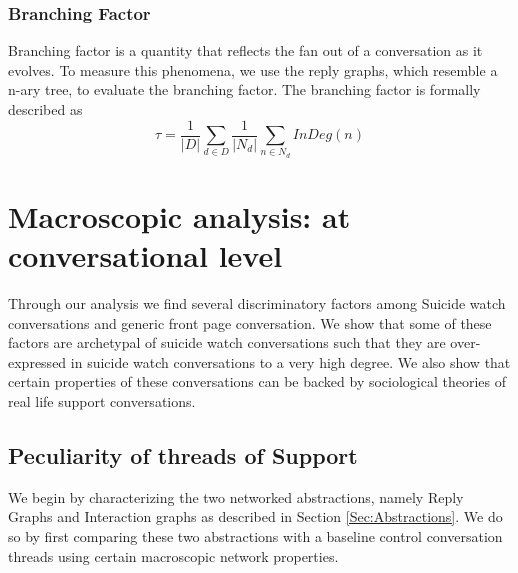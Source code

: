 \subsubsection{Branching Factor}
\label{Sec:Branching}
Branching factor is a quantity that reflects the fan out of a conversation as it evolves.
To measure this phenomena, we use the reply graphs, which resemble a n-ary tree, to evaluate the branching factor. The branching factor is formally described as 
$$\tau = \frac{1}{|D|} \sum_{d \in D}^{} \frac{1}{|N_d|} \sum_{n\in N_d}^{} \textit{InDeg}(n)$$




\section{Macroscopic analysis: at conversational level}

Through our analysis we find several discriminatory factors among Suicide watch conversations and generic front page conversation. We show that some of these factors are archetypal of suicide watch conversations such that they are over-expressed in suicide watch conversations to a very high degree. We also show that certain properties of these conversations can be backed by sociological theories of real life support conversations. 

\subsection{Peculiarity of threads of Support}
We begin by characterizing the two networked abstractions, namely Reply Graphs and Interaction graphs as described in Section \ref{Sec:Abstractions}. We do so by first comparing these two abstractions with a baseline control conversation threads using certain macroscopic network properties. 

